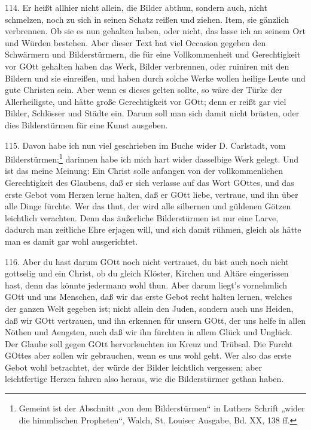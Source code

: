 114. Er heißt allhier nicht allein, die Bilder abthun, sondern auch, nicht schmelzen, noch zu sich in seinen Schatz reißen und ziehen. Item, sie gänzlich verbrennen. Ob sie es nun gehalten
haben, oder nicht, das lasse ich an seinem Ort und Würden bestehen. Aber dieser Text hat viel Occasion gegeben den Schwärmern und Bilderstürmern, die für eine Vollkommenheit und Gerechtigkeit vor GOtt gehalten haben das Werk, Bilder verbrennen, oder ruiniren mit den Bildern und sie einreißen, und haben durch solche Werke wollen heilige Leute und gute Christen sein. Aber wenn es dieses gelten sollte, so wäre der Türke der Allerheiligste, und hätte große Gerechtigkeit vor GOtt; denn er reißt gar viel Bilder, Schlösser und Städte ein. Darum soll man sich damit nicht brüsten, oder dies Bilderstürmen für eine Kunst ausgeben.

115. Davon habe ich nun viel geschrieben im Buche wider D. Carlstadt, vom Bilderstürmen;\footnote{Gemeint ist der Abschnitt „von dem Bilderstürmen“ in Luthers Schrift „wider die himmlischen Propheten“, Walch, St. Louiser Ausgabe, Bd. XX, 138 ff.} darinnen habe ich mich hart wider dasselbige Werk gelegt. Und ist das meine Meinung: Ein Christ solle anfangen von der vollkommenlichen Gerechtigkeit des Glaubens, daß er sich verlasse auf das Wort GOttes, und das erste Gebot vom Herzen lerne halten, daß er GOtt liebe, vertraue, und ihn über alle Dinge fürchte. Wer das thut, der wird alle silbernen und güldenen Götzen leichtlich verachten. Denn das äußerliche Bilderstürmen ist nur eine Larve, dadurch man zeitliche Ehre erjagen will, und sich damit rühmen, gleich als hätte man es damit gar wohl ausgerichtet.

116. Aber du hast darum GOtt noch nicht vertrauet, du bist auch noch nicht gottselig und ein Christ, ob du gleich Klöster, Kirchen und Altäre eingerissen hast, denn das könnte jedermann wohl thun. Aber darum liegt’s vornehmlich GOtt und uns Menschen, daß wir das erste Gebot recht halten lernen, welches der ganzen Welt gegeben ist; nicht allein den Juden, sondern auch uns Heiden, daß wir GOtt vertrauen, und ihn erkennen für unsern GOtt, der uns helfe in allen Nöthen und Aengsten, auch daß wir ihn fürchten in allem Glück und Unglück. Der Glaube soll gegen GOtt hervorleuchten im Kreuz und Trübsal. Die Furcht GOttes aber sollen wir gebrauchen, wenn es uns wohl geht. Wer also das erste Gebot wohl betrachtet, der würde der Bilder leichtlich vergessen; aber leichtfertige Herzen fahren also heraus, wie die Bilderstürmer gethan haben.

